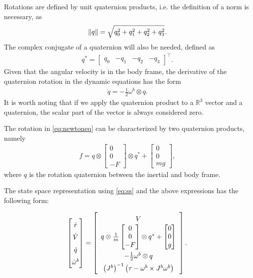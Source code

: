Rotations are defined by unit quaternion products, i.e. the definition of a norm is necessary, as
\begin{align}
    \norm{q} = \sqrt{q_0^2+q_1^2+q_2^2+q_3^2}.
\end{align}
The complex conjugate of a quaternion will also be needed, defined as
\begin{align}
    q^* = \begin{bmatrix}q_0 & -q_1 & -q_2 & -q_3 \end{bmatrix}^\top.
\end{align}
Given that the angular velocity is in the body frame, the derivative of the quaternion rotation in the dynamic equations has the form \cite{quaternion}
\begin{align}
    \dot{q} =-\frac{1}{2} \omega^b \otimes q.
\end{align}
It is worth noting that if we apply the quaternion product to a $\mathbb{R}^3$ vector and a quaternion, the scalar part of the vector is always considered zero.

The rotation in \eqref{eq:newtoneq} can be characterized by two quaternion products, namely
\begin{align}
    f = q\otimes\begin{bmatrix}0 \\ 0 \\ -F\end{bmatrix}\otimes q^* + \begin{bmatrix}0 \\ 0 \\ mg\end{bmatrix},
\end{align}
where $q$ is the rotation quaternion between the inertial and body frame.

The state space representation using \eqref{eq:ss} and the above expressions has the following form:

\begin{equation}\label{eq:quatss}
\def\arraystretch{1.5}
\begin{bmatrix}
\dot{r} \\ \dot{V} \\ \dot{q} \\ \dot{\omega}^b
\end{bmatrix} = \left[\begin{array}{c}
V \\ q\otimes\frac{1}{m}\def\arraystretch{1}\begin{bmatrix}0 \\ 0 \\ -F \end{bmatrix}\otimes q^* + \begin{bmatrix}0 \\ 0 \\ g\end{bmatrix} \\ -\frac{1}{2} \omega^b \otimes q \\\left(J^b\right)^{-1}\left(\tau - \omega^b\times J^b \omega^b\right)
\end{array} \right].
\end{equation}


